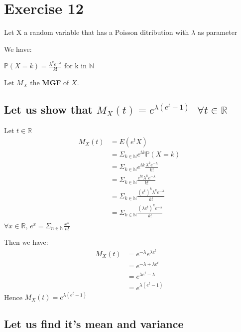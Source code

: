 \documentclass[11pt]{article}
\begin{document}
\newpage 
    \section{Exercise 12}
    
   
   Let X a random variable that has a Poisson ditribution with $\lambda$ as parameter
   
   We have:
   
    $\mathbb{P}(X=k)=\frac{\lambda^{k} e^{-\lambda}}{k! } \text{ for k in } \mathbb{N}$
   
   
   Let $M_X$ the \textbf{MGF} of $X$.
  
\subsection{Let us show that $M_X(t)=e^{\lambda(e^t-1)}\text{        } \forall t \in \mathbb{R}$} 
Let $t \in \mathbb{R}$
\begin{align*}
M_X(t)&=E(e^tX)\\
	&=\Sigma_{k\in \mathbb{N}  }e^{tk}\mathbb{P}(X=k)  \\
	&=\Sigma_{k\in \mathbb{N}  }e^{tk}\frac{\lambda^{k} e^{-\lambda}}{k!}  \\
	&=\Sigma_{k\in \mathbb{N}  }\frac{e^{tk}\lambda^{k} e^{-\lambda}}{k!}  \\
	 &=\Sigma_{k\in \mathbb{N}  }\frac{(e^{t})^k\lambda^{k} e^{-\lambda}}{k!}  \\
	 &=\Sigma_{k\in \mathbb{N}  }\frac{(\lambda e^{t})^k e^{-\lambda}}{k!}  \\
\end{align*}
$\forall x \in \mathbb{R}\text{, } e^x= \Sigma_{n\in \mathbb{N}  }\frac{x^{n}}{n!}$

Then we have:
\begin{align*}
M_X(t)&=e^{-\lambda}e^{\lambda e^t}\\
	&=e^{-\lambda+\lambda e^t}\\
	&=e^{\lambda e^t-\lambda}\\
	&=e^{\lambda( e^t-1)}
\end{align*}
Hence $M_X(t)=e^{\lambda( e^t-1)}$
   
\subsection{Let us find it's mean and variance}
\end{document}
